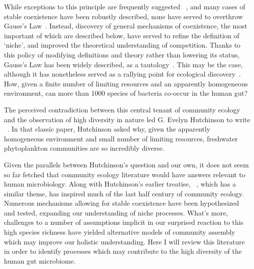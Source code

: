 \documentclass[12pt]{article}
\begin{document}
While exceptions to this principle are frequently suggested%
~\citep{Koch1974a,Koch1974b},
and many cases of stable coexistence have been robustly described,
none have served to overthrow Gause's Law~\citep{Hutchinson1957}.
Instead, discovery of general mechanisms of coexistence, the
most important of which are described below, have served
to refine the definition of `niche', and improved the theoretical
understanding of competition.
Thanks to this policy of modifying definitions and theory
rather than lowering its status, Gause's Law has been widely described,
as a tautology~\citep{Hutchinson1961,Slobodkin1961}.
This may be the case, although it has nonetheless served as a
rallying point for ecological discovery~\citep{Armstrong1980}.
How, given a finite number of limiting resources and an apparently
homogeneous environment, can more than 1000 species of bacteria
co-occur in the human gut?

The perceived contradiction between this central tenant
of community ecology
and the observation of high diversity in nature led
G. Evelyn Hutchinson to write
~\citeyearpar{Hutchinson1961}.
In that classic paper, Hutchinson asked why,
given the apparently homogeneous environment
and small number of limiting resources,
freshwater phytoplankton communities are so incredibly diverse.

Given the parallels between Hutchinson's question and our own,
it does not seem so far fetched that community ecology literature would have
answers relevant to human microbiology.
Along with Hutchinson's earlier treatise,
~\citeyearpar{Hutchinson1959},
which has a similar theme,
 has inspired much of the
last half century of community ecology.
Numerous mechanisms allowing for stable coexistence have been
hypothesized and tested, expanding our understanding of niche
processes.
What's more, challenges to a number of assumptions implicit in our
surprised reaction to this high species richness
have yielded alternative models of community assembly
which may improve our holistic understanding.
Here I will review this literature in order to identify processes which may
contribute to the high diversity of the human gut microbiome.
\end{document}
